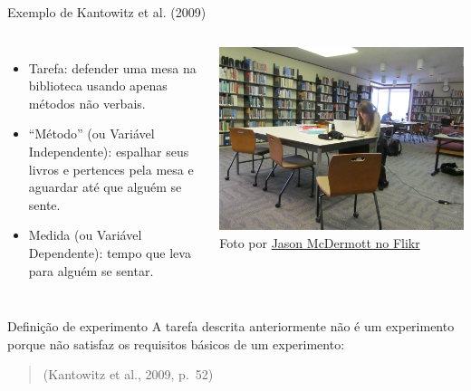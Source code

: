 \documentclass[numbering=fraction,aspectratio=169]{beamer}
\begin{document}
\begin{frame}{Exemplo de Kantowitz et al. (2009)}
  \begin{columns}
    \begin{itemize}
    \item<1-> Tarefa: \alert{defender uma mesa na biblioteca} usando apenas métodos não verbais.
    \item<2-> “Método” (ou Variável Independente): \alert{espalhar seus livros e pertences pela mesa} e aguardar até que alguém se sente.
    \item<3-> Medida (ou Variável Dependente): \alert{tempo} que leva para alguém se sentar.
    \end{itemize}

    \centering
    \includegraphics[width=\textwidth]{img/table}\\
    {\footnotesize Foto por \href{https://www.flickr.com/photos/jasonmcdermott/5265264116}{Jason McDermott no Flikr}}
  \end{columns}
\end{frame}

\begin{frame}{Definição de experimento}
  A tarefa descrita anteriormente não é um experimento porque não satisfaz os requisitos básicos de um experimento:
  \medskip

  \begin{quote}

    \raggedleft
    (Kantowitz et al., 2009, p.~52)
  \end{quote}

\end{frame}
\end{document}
